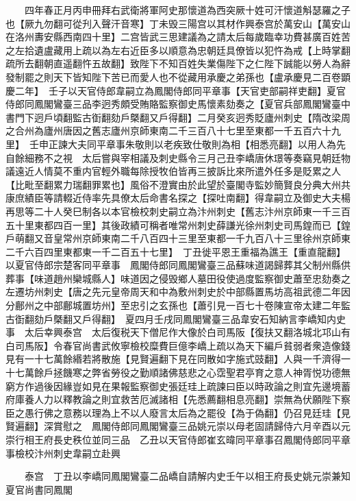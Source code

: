 　　四年春正月丙申冊拜右武衛將軍阿史那懷道為西突厥十姓可汗懷道斛瑟羅之子也【厥九勿翻可從刋入聲汗音寒】丁未毁三陽宫以其材作興泰宫於萬安山【萬安山在洛州夀安縣西南四十里】二宫皆武三思建議為之請太后每歲臨幸功費甚廣百姓苦之左拾遺盧藏用上疏以為左右近臣多以順意為忠朝廷具僚皆以犯忤為戒【上時掌翻疏所去翻朝直遥翻忤五故翻】致陛下不知百姓失業傷陛下之仁陛下誠能以勞人為辭發制罷之則天下皆知陛下苦已而愛人也不從藏用承慶之弟孫也【盧承慶見二百卷顕慶二年】　壬子以天官侍郎韋嗣立為鳳閣侍郎同平章事【天官吏部嗣祥吏翻】夏官侍郎同鳳閣鸞臺三品李迥秀頗受賄賂監察御史馬懷素劾奏之【夏官兵部鳳閣鸞臺中書門下迥戶頃翻監古衘翻劾戶槩翻又戶得翻】二月癸亥迥秀貶廬州刺史【隋改梁周之合州為廬州唐因之舊志廬州京師東南二千三百八十七里至東都一千五百六十九里】　壬申正諫大夫同平章事朱敬則以老疾致仕敬則為相【相悉亮翻】以用人為先自餘細務不之視　太后嘗與宰相議及刺史縣令三月己丑李嶠唐休璟等奏竊見朝廷物議遠近人情莫不重内官輕外職每除授牧伯皆再三披訴比來所遣外任多是貶累之人【比毗至翻累力瑞翻罪累也】風俗不澄實由於此望於臺閣寺監妙簡賢良分典大州共康庶績臣等請輟近侍率先具僚太后命書名探之【探吐南翻】得韋嗣立及御史大夫楊再思等二十人癸巳制各以本官檢校刺史嗣立為汴州刺史【舊志汴州京師東一千三百五十里東都四百一里】其後政績可稱者唯常州刺史薛謙光徐州刺史司馬鍠而已【鍠戶萌翻又音皇常州京師東南二千八百四十三里至東都一千九百八十三里徐州京師東二千六百四里東都東一千二百五十七里】　丁丑徙平恩王重福為譙王【重直龍翻】　以夏官侍郎宗楚客同平章事　鳳閣侍郎同鳳閣鸞臺三品蘇味道謁歸葬其父制州縣供葬事【味道趙州欒城縣人】味道因之侵毁鄉人墓田役使過度監察御史蕭至忠劾奏之左遷坊州刺史【唐之先元皇帝周天和中為敷州刺史於中部縣置馬坊高祖武德二年因分鄜州之中部鄜城置坊州】至忠引之玄孫也【蕭引見一百七十卷陳宣帝太建二年監古衘翻劾戶槩翻又戶得翻】　夏四月壬戌同鳳閣鸞臺三品韋安石知納言李嶠知内史事　太后幸興泰宫　太后復税天下僧尼作大像於白司馬阪【復扶又翻洛城北邛山有白司馬阪】令春官尚書武攸寧檢校糜費巨億李嶠上疏以為天下編戶貧弱者衆造像錢見有一十七萬餘緡若將散施【見賢遍翻下見在同散如字施式豉翻】人與一千濟得一十七萬餘戶拯饑寒之弊省勞役之勤順諸佛慈悲之心霑聖君亭育之意人神胥悦功德無窮方作過後因緣豈如見在果報監察御史張廷珪上疏諫曰臣以時政論之則宜先邊境蓄府庫養人力以釋教論之則宜救苦厄滅諸相【先悉薦翻相息亮翻】崇無為伏願陛下察臣之愚行佛之意務以理為上不以人廢言太后為之罷役【為于偽翻】仍召見廷珪【見賢遍翻】深賞慰之　鳳閣侍郎同鳳閣鸞臺三品姚元崇以母老固請歸侍六月辛酉以元崇行相王府長史秩位並同三品　乙丑以天官侍郎崔玄暐同平章事召鳳閣侍郎同平章事檢校汴州刺史韋嗣立赴興

　　泰宫　丁丑以李嶠同鳳閣鸞臺二品嶠自請解内史壬午以相王府長史姚元崇兼知夏官尚書同鳳閣

